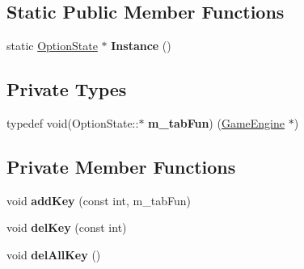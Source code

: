 \subsection*{Static Public Member Functions}
\begin{DoxyCompactItemize}
\item 
\hypertarget{class_option_state_a3130decb6992095c8e042eb4f8175cb1}{}static \hyperlink{class_option_state}{Option\+State} $\ast$ {\bfseries Instance} ()\label{class_option_state_a3130decb6992095c8e042eb4f8175cb1}

\end{DoxyCompactItemize}
\subsection*{Private Types}
\begin{DoxyCompactItemize}
\item 
\hypertarget{class_option_state_ac01f0434b89ee546806140277940a658}{}typedef void(Option\+State\+::$\ast$ {\bfseries m\+\_\+tab\+Fun}) (\hyperlink{class_game_engine}{Game\+Engine} $\ast$)\label{class_option_state_ac01f0434b89ee546806140277940a658}

\end{DoxyCompactItemize}
\subsection*{Private Member Functions}
\begin{DoxyCompactItemize}
\item 
\hypertarget{class_option_state_a8815778c9f0164c8f3d00f8e6543dc4f}{}void {\bfseries add\+Key} (const int, m\+\_\+tab\+Fun)\label{class_option_state_a8815778c9f0164c8f3d00f8e6543dc4f}

\item 
\hypertarget{class_option_state_acebb6e5fcc7cae22a0e9ca94df1696c9}{}void {\bfseries del\+Key} (const int)\label{class_option_state_acebb6e5fcc7cae22a0e9ca94df1696c9}

\item 
\hypertarget{class_option_state_a59cb08c0f395176356da90523cc30ad8}{}void {\bfseries del\+All\+Key} ()\label{class_option_state_a59cb08c0f395176356da90523cc30ad8}

\end{DoxyCompactItemize}
